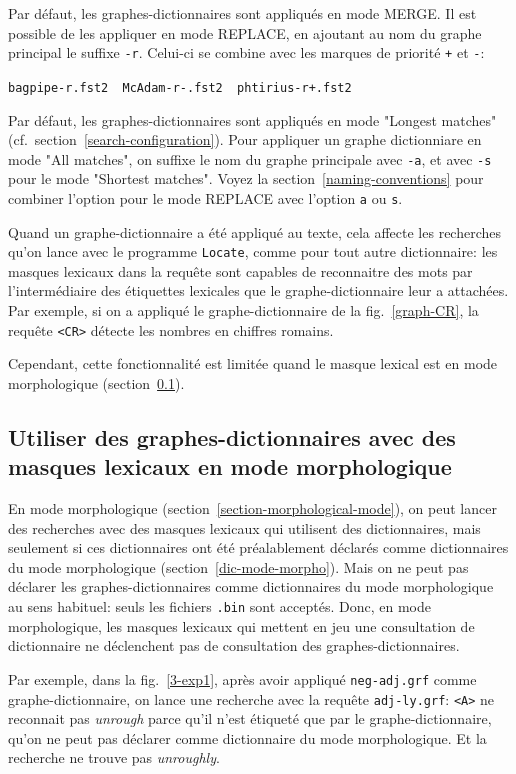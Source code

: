 \bigskip
\noindent Par défaut, les graphes-dictionnaires sont appliqués en mode MERGE. Il est possible 
de les appliquer en mode REPLACE, en ajoutant au nom du graphe principal le suffixe \verb+-r+.
Celui-ci se combine avec les marques de priorité \verb-+- et \verb+-+:

\bigskip
\verb?bagpipe-r.fst2  McAdam-r-.fst2  phtirius-r+.fst2?

\bigskip
\noindent Par défaut, les graphes-dictionnaires sont appliqués en mode "Longest matches"
(cf.~section~\ref{search-configuration}).
Pour appliquer un graphe dictionniare en mode "All matches", on suffixe le nom du graphe
principale avec \verb+-a+, et avec \verb+-s+ pour le mode "Shortest matches".
Voyez la section~\ref{naming-conventions} pour combiner l'option pour le mode REPLACE
avec l'option \verb+a+ ou \verb+s+.

\bigskip
\noindent Quand un graphe-dic\-tion\-naire a été appliqué au texte, cela affecte les recherches
qu'on lance avec le programme \verb+Locate+, comme pour tout autre dictionnaire: les masques
lexicaux dans la requête sont capables de reconnaitre des mots par l'intermédiaire des
étiquettes lexicales que le graphe-dic\-tion\-naire leur a attachées. Par exemple, si on a appliqué le
graphe-dic\-tion\-naire de la fig.~\ref{graph-CR}, la requête \verb+<CR>+ détecte les nombres en
chiffres romains.

\bigskip
\noindent Cependant, cette fonctionnalité est limitée quand le masque lexical est en mode
morphologique (section~\ref{dg-and-mm}).

\subsection{Utiliser des graphes-dictionnaires avec des masques lexicaux en mode morphologique}
\label{dg-and-mm}
En mode morphologique (section~\ref{section-morphological-mode}), on peut lancer des
recherches avec des masques lexicaux qui utilisent des dictionnaires, mais seulement si ces
dictionnaires ont été préalablement déclarés comme dictionnaires du mode morphologique
(section~\ref{dic-mode-morpho}).
Mais on ne peut pas déclarer les graphes-dictionnaires comme dictionnaires du mode
morphologique au sens habituel: seuls les fichiers \verb+.bin+ sont acceptés.
Donc, en mode morphologique, les masques lexicaux qui mettent en jeu une consultation de
dictionnaire ne déclenchent pas de consultation des graphes-dictionnaires.

\bigskip
\noindent Par exemple, dans la fig.~\ref{3-exp1}, après avoir appliqué
\verb+neg-adj.grf+ comme graphe-dic\-tion\-naire, on lance une recherche avec la requête
\verb+adj-ly.grf+:
\verb+<A>+ ne reconnait pas \textit{unrough} parce qu'il n'est étiqueté que par le graphe-dic\-tion\-naire,
qu'on ne peut pas déclarer comme dictionnaire du mode morphologique. Et la recherche ne
trouve pas \textit{unroughly}.

